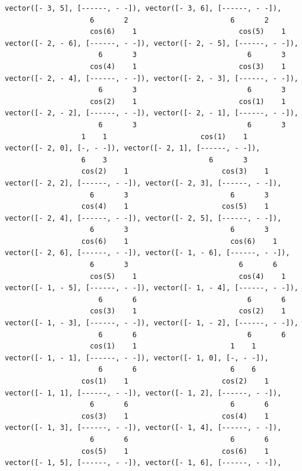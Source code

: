\documentclass[12pt,letterpaper]{article}
\begin{document}
\begin{verbatim}
vector([- 3, 5], [------, - -]), vector([- 3, 6], [------, - -]), 
                    6       2                        6       2
                    cos(6)    1                        cos(5)    1
vector([- 2, - 6], [------, - -]), vector([- 2, - 5], [------, - -]), 
                      6       3                          6       3
                    cos(4)    1                        cos(3)    1
vector([- 2, - 4], [------, - -]), vector([- 2, - 3], [------, - -]), 
                      6       3                          6       3
                    cos(2)    1                        cos(1)    1
vector([- 2, - 2], [------, - -]), vector([- 2, - 1], [------, - -]), 
                      6       3                          6       3
                  1    1                      cos(1)    1
vector([- 2, 0], [-, - -]), vector([- 2, 1], [------, - -]), 
                  6    3                        6       3
                  cos(2)    1                      cos(3)    1
vector([- 2, 2], [------, - -]), vector([- 2, 3], [------, - -]), 
                    6       3                        6       3
                  cos(4)    1                      cos(5)    1
vector([- 2, 4], [------, - -]), vector([- 2, 5], [------, - -]), 
                    6       3                        6       3
                  cos(6)    1                        cos(6)    1
vector([- 2, 6], [------, - -]), vector([- 1, - 6], [------, - -]), 
                    6       3                          6       6
                    cos(5)    1                        cos(4)    1
vector([- 1, - 5], [------, - -]), vector([- 1, - 4], [------, - -]), 
                      6       6                          6       6
                    cos(3)    1                        cos(2)    1
vector([- 1, - 3], [------, - -]), vector([- 1, - 2], [------, - -]), 
                      6       6                          6       6
                    cos(1)    1                      1    1
vector([- 1, - 1], [------, - -]), vector([- 1, 0], [-, - -]), 
                      6       6                      6    6
                  cos(1)    1                      cos(2)    1
vector([- 1, 1], [------, - -]), vector([- 1, 2], [------, - -]), 
                    6       6                        6       6
                  cos(3)    1                      cos(4)    1
vector([- 1, 3], [------, - -]), vector([- 1, 4], [------, - -]), 
                    6       6                        6       6
                  cos(5)    1                      cos(6)    1
vector([- 1, 5], [------, - -]), vector([- 1, 6], [------, - -]), 

\end{verbatim}
\end{document}
